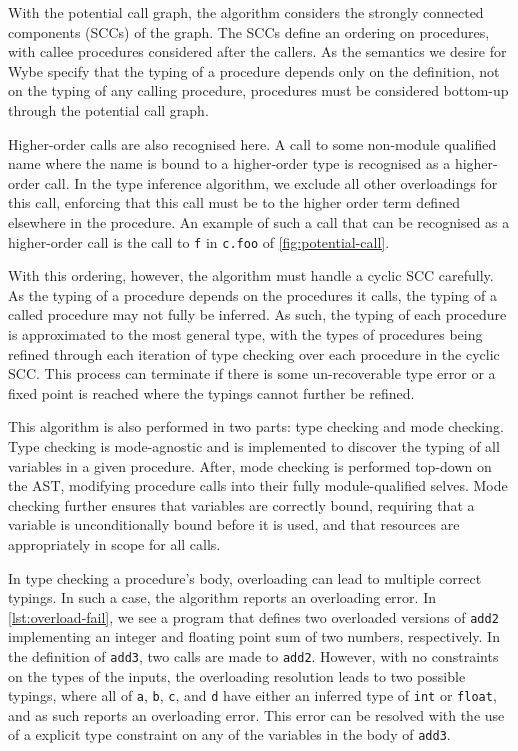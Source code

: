 With the potential call graph, the algorithm considers the strongly connected components (SCCs) of the graph. The SCCs define an ordering on procedures, with callee procedures considered after the callers. As the semantics we desire for Wybe specify that the typing of a procedure depends only on the definition, not on the typing of any calling procedure, procedures must be considered bottom-up through the potential call graph.

Higher-order calls are also recognised here. A call to some non-module qualified name where the name is bound to a higher-order type is recognised as a higher-order call. In the type inference algorithm, we exclude all other overloadings for this call, enforcing that this call must be to the higher order term defined elsewhere in the procedure. An example of such a call that can be recognised as a higher-order call is the call to \texttt{f} in \texttt{c.foo} of \cref{fig:potential-call}. 

With this ordering, however, the algorithm must handle a cyclic SCC carefully. As the typing of a procedure depends on the procedures it calls, the typing of a called procedure may not fully be inferred. As such, the typing of each procedure is approximated to the most general type, with the types of procedures being refined through each iteration of type checking over each procedure in the cyclic SCC. This process can terminate if there is some un-recoverable type error or a fixed point is reached where the typings cannot further be refined. 

This algorithm is also performed in two parts: type checking and mode checking. Type checking is mode-agnostic and is implemented to discover the typing of all variables in a given procedure. After, mode checking is performed top-down on the AST, modifying procedure calls into their fully module-qualified selves. Mode checking further ensures that variables are correctly bound, requiring that a variable is unconditionally bound before it is used, and that resources are appropriately in scope for all calls.

In type checking a procedure's body, overloading can lead to multiple correct typings. In such a case, the algorithm reports an overloading error. In \cref{lst:overload-fail}, we see a program that defines two overloaded versions of \texttt{add2} implementing an integer and floating point sum of two numbers, respectively. In the definition of \texttt{add3}, two calls are made to \texttt{add2}. However, with no constraints on the types of the inputs, the overloading resolution leads to two possible typings, where all of \texttt{a}, \texttt{b}, \texttt{c}, and \texttt{d} have either an inferred type of \texttt{int} or \texttt{float}, and as such reports an overloading error. This error can be resolved with the use of a explicit type constraint on any of the variables in the body of \texttt{add3}.

